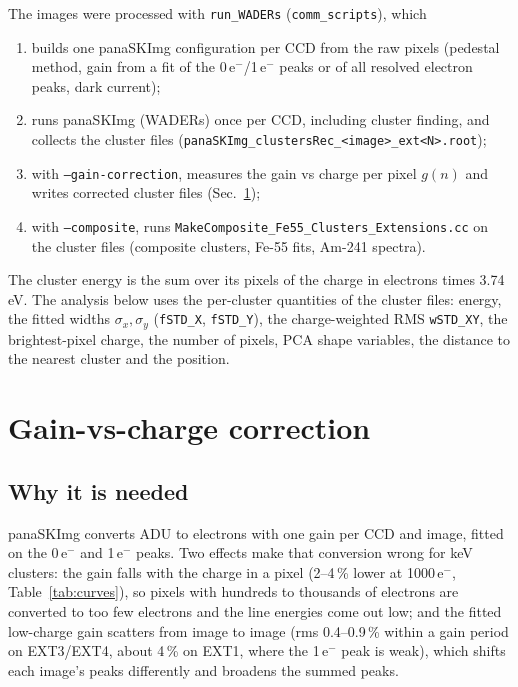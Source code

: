 \documentclass[11pt,a4paper]{article}
\begin{document}
The images were processed with \texttt{run\_WADERs} (\texttt{comm\_scripts}), which
\begin{enumerate}
\item builds one panaSKImg configuration per CCD from the raw pixels (pedestal method, gain from a fit of
the 0\,e$^-$/1\,e$^-$ peaks or of all resolved electron peaks, dark current);
\item runs panaSKImg (WADERs) once per CCD, including cluster finding, and collects the cluster files
(\texttt{panaSKImg\_clustersRec\_<image>\_ext<N>.root});
\item with \texttt{--gain-correction}, measures the gain vs charge per pixel $g(n)$ and writes corrected cluster
files (Sec.~\ref{sec:gain});
\item with \texttt{--composite}, runs \texttt{MakeComposite\_Fe55\_Clusters\_Extensions.cc} on the cluster
files (composite clusters, Fe-55 fits, Am-241 spectra).
\end{enumerate}
The cluster energy is the sum over its pixels of the charge in electrons times 3.74\,eV. The analysis below
uses the per-cluster quantities of the cluster files: energy, the fitted widths $\sigma_x,\sigma_y$
(\texttt{fSTD\_X}, \texttt{fSTD\_Y}), the charge-weighted RMS \texttt{wSTD\_XY}, the brightest-pixel charge,
the number of pixels, PCA shape variables, the distance to the nearest cluster and the position.

\section{Gain-vs-charge correction}
\label{sec:gain}
\subsection{Why it is needed}
panaSKImg converts ADU to electrons with one gain per CCD and image, fitted on the 0\,e$^-$ and 1\,e$^-$ peaks.
Two effects make that conversion wrong for keV clusters: the gain falls with the charge in a pixel (2--4\,\%
lower at 1000\,e$^-$, Table~\ref{tab:curves}), so pixels with hundreds to thousands of electrons are converted to
too few electrons and the line energies come out low; and the fitted low-charge gain scatters from image to image
(rms 0.4--0.9\,\% within a gain period on EXT3/EXT4, about 4\,\% on EXT1, where the 1\,e$^-$ peak is weak), which shifts each image's peaks
differently and broadens the summed peaks.
\end{document}
